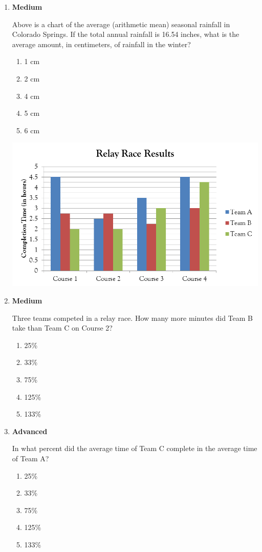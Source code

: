 \documentclass[12pt]{book}
\newcommand{\medium}{\textbf{Medium} }
\newcommand{\advanced}{\textbf{Advanced} }
\begin{document}
\begin{enumerate}
\item \medium

Above is a chart of the average (arithmetic mean) seasonal rainfall in Colorado Springs. If the total annual rainfall is 16.54 inches, what is the average amount, in centimeters, of rainfall in the winter?

\begin{enumerate}[label=(\Alph*)]
\item 1 cm
\item 2 cm
\item 4 cm
\item 5 cm
\item 6 cm
\end{enumerate}

\vfill
\newpage
\centerline{\includegraphics{59}}

\item \medium

Three teams competed in a relay race. How many more minutes did Team B take than Team C on Course 2?

\begin{enumerate}[label=(\Alph*)]
\item 25\%
\item 33\%
\item 75\%
\item 125\%
\item 133\%
\end{enumerate}

\vfill
\item \advanced

In what percent did the average time of Team C complete in the average time of Team A?

\begin{enumerate}[label=(\Alph*)]
\item 25\%
\item 33\%
\item 75\%
\item 125\%
\item 133\%
\end{enumerate}


\end{enumerate}
\end{document}
